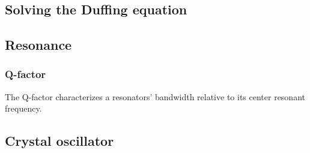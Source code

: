 \subsection{Solving the Duffing equation}


\subsection{Resonance}



\subsubsection{Q-factor}
The Q-factor characterizes a resonators' bandwidth relative to its center resonant frequency.\cite{electroniccircuits} 

\subsection{Crystal oscillator}
